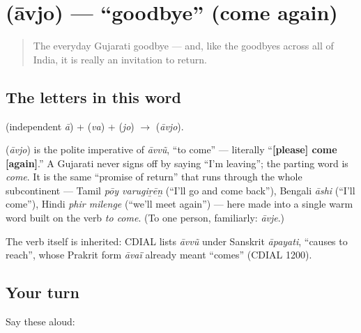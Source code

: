 \section[\texorpdfstring{\gu{આવજો} (āvjo)}{આવજો (āvjo)}]{ (āvjo) — \textquotedblleft{}goodbye\textquotedblright{} (come again)}

\label{lesson:GU-C01-aavjo}



\begin{quote}
The everyday Gujarati goodbye — and, like the goodbyes across all of India, it is really an invitation to return.
\end{quote}

\subsection*{The letters in this word}
\textbf{} (independent \emph{ā}) + \textbf{} (\emph{va}) + \textbf{} (\emph{jo}) $\to$ \textbf{} (\emph{āvjo}).

\begin{cousinweb}
\textbf{} (\emph{āvjo}) is the polite imperative of \emph{āvvũ}, \textquotedblleft{}to come\textquotedblright{} — literally \textquotedblleft{}\textbf{{[}please{]} come {[}again{]}}.\textquotedblright{} A Gujarati never signs off by saying \textquotedblleft{}I'm leaving\textquotedblright{}; the parting word is \emph{come}. It is the same \textquotedblleft{}promise of return\textquotedblright{} that runs through the whole subcontinent — Tamil \emph{pōy varugiṟēṉ} (\textquotedblleft{}I'll go and come back\textquotedblright{}), Bengali \emph{āshi} (\textquotedblleft{}I'll come\textquotedblright{}), Hindi \emph{phir milenge} (\textquotedblleft{}we'll meet again\textquotedblright{}) — here made into a single warm word built on the verb \emph{to come}. (To one person, familiarly: \textbf{} \emph{āvje}.)

The verb itself is inherited: CDIAL lists \emph{āvvũ} under Sanskrit \emph{āpayati}, \textquotedblleft{}causes to reach\textquotedblright{}, whose Prakrit form \emph{āvaï} already meant \textquotedblleft{}comes\textquotedblright{} (CDIAL 1200).
\end{cousinweb}

\subsection*{Your turn}
Say these aloud:

